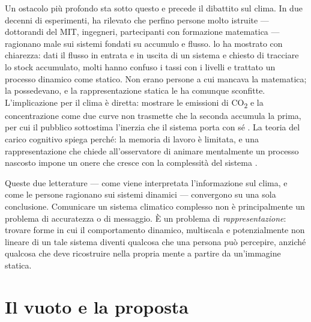 Un ostacolo più profondo sta sotto questo e precede il dibattito sul clima. In due decenni di esperimenti, \citet{sterman2008} ha rilevato che perfino persone molto istruite --- dottorandi del MIT, ingegneri, partecipanti con formazione matematica --- ragionano male sui sistemi fondati su accumulo e flusso. \citet{cronin2009} lo ha mostrato con chiarezza: dati il flusso in entrata e in uscita di un sistema e chiesto di tracciare lo stock accumulato, molti hanno confuso i tassi con i livelli e trattato un processo dinamico come statico. Non erano persone a cui mancava la matematica; la possedevano, e la rappresentazione statica le ha comunque sconfitte. L'implicazione per il clima è diretta: mostrare le emissioni di CO\textsubscript{2} e la concentrazione come due curve non trasmette che la seconda accumula la prima, per cui il pubblico sottostima l'inerzia che il sistema porta con sé \citep{cronin2009, sterman2008}. La teoria del carico cognitivo spiega perché: la memoria di lavoro è limitata, e una rappresentazione che chiede all'osservatore di animare mentalmente un processo nascosto impone un onere che cresce con la complessità del sistema \citep{sweller1988}.

Queste due letterature --- come viene interpretata l'informazione sul clima, e come le persone ragionano sui sistemi dinamici --- convergono su una sola conclusione. Comunicare un sistema climatico complesso non è principalmente un problema di accuratezza o di messaggio. È un problema di \emph{rappresentazione}: trovare forme in cui il comportamento dinamico, multiscala e potenzialmente non lineare di un tale sistema diventi qualcosa che una persona può percepire, anziché qualcosa che deve ricostruire nella propria mente a partire da un'immagine statica.


\section{Il vuoto e la proposta}
\label{sec:gap-proposal}

